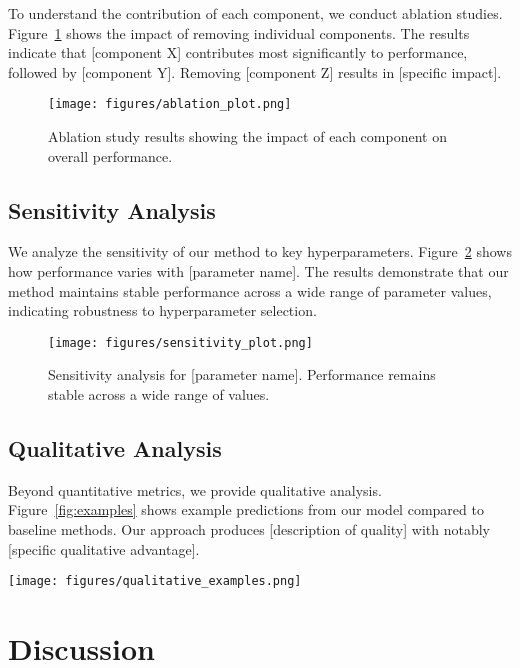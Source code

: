 \documentclass[12pt,a4paper]{article}
\theoremstyle{definition}
\theoremstyle{remark}
\begin{document}
To understand the contribution of each component, we conduct ablation studies. Figure~\ref{fig:ablation} shows the impact of removing individual components. The results indicate that [component X] contributes most significantly to performance, followed by [component Y]. Removing [component Z] results in [specific impact].

\begin{figure}[ht]
\centering
\texttt{[image: figures/ablation\_plot.png]}
\caption{Ablation study results showing the impact of each component on overall performance.}
\label{fig:ablation}
\end{figure}

\subsection{Sensitivity Analysis}
\label{subsec:sensitivity}

We analyze the sensitivity of our method to key hyperparameters. Figure~\ref{fig:sensitivity} shows how performance varies with [parameter name]. The results demonstrate that our method maintains stable performance across a wide range of parameter values, indicating robustness to hyperparameter selection.

\begin{figure}[ht]
\centering
\texttt{[image: figures/sensitivity\_plot.png]}
\caption{Sensitivity analysis for [parameter name]. Performance remains stable across a wide range of values.}
\label{fig:sensitivity}
\end{figure}

\subsection{Qualitative Analysis}
\label{subsec:qualitative}

Beyond quantitative metrics, we provide qualitative analysis. Figure~\ref{fig:examples} shows example predictions from our model compared to baseline methods. Our approach produces [description of quality] with notably [specific qualitative advantage].

\begin{figure*}[ht]
\centering
\texttt{[image: figures/qualitative\_examples.png]}
\caption{Qualitative comparison of predictions. Our method produces [description of quality].}
\label{fig:examples}
\end{figure*}

\section{Discussion}
\label{sec:discussion}
\end{document}
